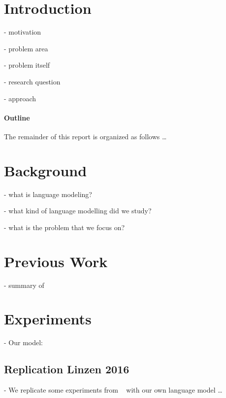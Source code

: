 \documentclass[twoside]{article}
\begin{document}
\begin{multicols}{2} %

\section{Introduction}
- motivation

- problem area

- problem itself

- research question

- approach

\paragraph{Outline}
The remainder of this report is organized as follows \ldots



\section{Background}
\label{background}

- what is language modeling?

- what kind of language modelling did we study?

- what is the problem that we focus on?




\section{Previous Work}
\label{previous work}

- summary of ~\cite{Linzen2016}




\section{Experiments}
\label{experiments}

- Our model:

\subsection{Replication Linzen 2016}
\label{replication}

- We replicate some experiments from ~\cite{Linzen2016} with our own language model \ldots



\end{multicols}
\end{document}
